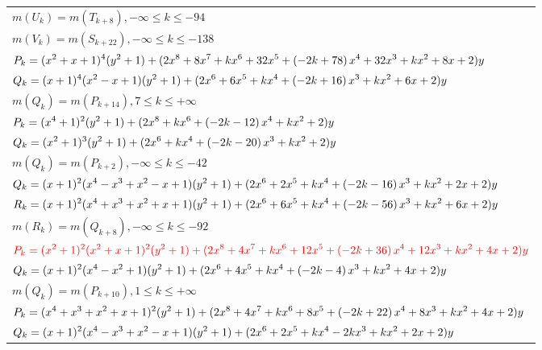 \documentclass{amsart}
\begin{document}
\begin{longtable}{|l|}
\(\displaystyle m(U_k) = m(T_{k
 + 8}),-\infty \leqslant k \leqslant -94\)\\
\(\displaystyle m(V_k) = m(S_{k
 + 22}),-\infty \leqslant k \leqslant -138\)\\
\hline
\(\displaystyle P_k=(x^2
 + x
 + 1)^{4}(y^2+1)+(2\*x^8
 + 8\*x^7
 + k\*x^6
 + 32\*x^5
 + \left(-2\*k
 + 78\right) \*x^4
 + 32\*x^3
 + k\*x^2
 + 8\*x
 + 2)y\)\\
\(\displaystyle Q_k=(x
 + 1)^{4}(x^2
 - x
 + 1)(y^2+1)+(2\*x^6
 + 6\*x^5
 + k\*x^4
 + \left(-2\*k
 + 16\right) \*x^3
 + k\*x^2
 + 6\*x
 + 2)y\)\\
\(\displaystyle m(Q_k) = m(P_{k
 + 14}),7 \leqslant k \leqslant +\infty\)\\
\hline
\(\displaystyle P_k=(x^4
 + 1)^{2}(y^2+1)+(2\*x^8
 + k\*x^6
 + \left(-2\*k
 - 12\right) \*x^4
 + k\*x^2
 + 2)y\)\\
\(\displaystyle Q_k=(x^2
 + 1)^{3}(y^2+1)+(2\*x^6
 + k\*x^4
 + \left(-2\*k
 - 20\right) \*x^3
 + k\*x^2
 + 2)y\)\\
\(\displaystyle m(Q_k) = m(P_{k
 + 2}),-\infty \leqslant k \leqslant -42\)\\
\hline
\(\displaystyle Q_k=(x
 + 1)^{2}(x^4
 - x^3
 + x^2
 - x
 + 1)(y^2+1)+(2\*x^6
 + 2\*x^5
 + k\*x^4
 + \left(-2\*k
 - 16\right) \*x^3
 + k\*x^2
 + 2\*x
 + 2)y\)\\
\(\displaystyle R_k=(x
 + 1)^{2}(x^4
 + x^3
 + x^2
 + x
 + 1)(y^2+1)+(2\*x^6
 + 6\*x^5
 + k\*x^4
 + \left(-2\*k
 - 56\right) \*x^3
 + k\*x^2
 + 6\*x
 + 2)y\)\\
\(\displaystyle m(R_k) = m(Q_{k
 + 8}),-\infty \leqslant k \leqslant -92\)\\
\hline
\(\displaystyle \red{P_k=(x^2
 + 1)^{2}(x^2
 + x
 + 1)^{2}(y^2+1)+(2\*x^8
 + 4\*x^7
 + k\*x^6
 + 12\*x^5
 + \left(-2\*k
 + 36\right) \*x^4
 + 12\*x^3
 + k\*x^2
 + 4\*x
 + 2)y}\)\\
\(\displaystyle Q_k=(x
 + 1)^{2}(x^4
 - x^2
 + 1)(y^2+1)+(2\*x^6
 + 4\*x^5
 + k\*x^4
 + \left(-2\*k
 - 4\right) \*x^3
 + k\*x^2
 + 4\*x
 + 2)y\)\\
\(\displaystyle m(Q_k) = m(P_{k
 + 10}),1 \leqslant k \leqslant +\infty\)\\
\hline
\(\displaystyle P_k=(x^4
 + x^3
 + x^2
 + x
 + 1)^{2}(y^2+1)+(2\*x^8
 + 4\*x^7
 + k\*x^6
 + 8\*x^5
 + \left(-2\*k
 + 22\right) \*x^4
 + 8\*x^3
 + k\*x^2
 + 4\*x
 + 2)y\)\\
\(\displaystyle Q_k=(x
 + 1)^{2}(x^4
 - x^3
 + x^2
 - x
 + 1)(y^2+1)+(2\*x^6
 + 2\*x^5
 + k\*x^4
 - 2\*k\*x^3
 + k\*x^2
 + 2\*x
 + 2)y\)\\

\end{longtable}
\end{document}
